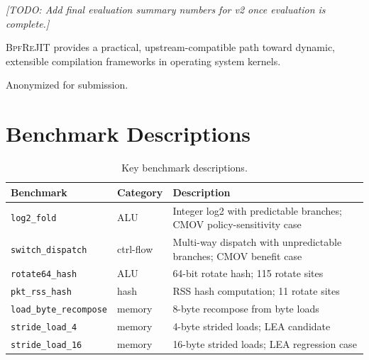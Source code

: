 \documentclass[sigconf,anonymous]{acmart}
\begin{document}
\textit{[TODO: Add final evaluation summary numbers for v2 once
evaluation is complete.]}

\textsc{BpfReJIT} provides a practical, upstream-compatible path toward
dynamic, extensible compilation frameworks in operating system kernels.

\begin{acks}
Anonymized for submission.
\end{acks}




\appendix

\section{Benchmark Descriptions}
\label{appendix:benchmarks}

\begin{table}[h]
  \centering
  \caption{Key benchmark descriptions.}
  \label{tab:bench_desc}
  \small
  \begin{tabular}{llp{4.2cm}}
    \toprule
    Benchmark & Category & Description \\
    \midrule
    \texttt{log2\_fold}            & ALU       & Integer log2 with predictable branches; CMOV policy-sensitivity case \\
    \texttt{switch\_dispatch}      & ctrl-flow & Multi-way dispatch with unpredictable branches; CMOV benefit case \\
    \texttt{rotate64\_hash}        & ALU       & 64-bit rotate hash; 115 rotate sites \\
    \texttt{pkt\_rss\_hash}        & hash      & RSS hash computation; 11 rotate sites \\
    \texttt{load\_byte\_recompose} & memory    & 8-byte recompose from byte loads \\
    \texttt{stride\_load\_4}       & memory    & 4-byte strided loads; LEA candidate \\
    \texttt{stride\_load\_16}      & memory    & 16-byte strided loads; LEA regression case \\
    \bottomrule
  \end{tabular}
\end{table}

\end{document}
